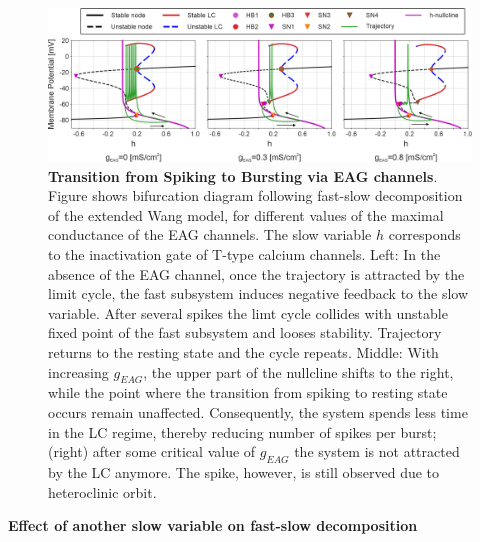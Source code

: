 \documentclass[../main.tex]{subfiles}
\begin{document}
\begin{figure}[!t]
    \centering
    \includegraphics[width=\linewidth]{../img/spiking_to_bursting/bifurcation_wang.png}
    \caption[Transition from Spiking to Bursting via EAG channels]{
        \textbf{Transition from Spiking to Bursting via EAG channels}. Figure shows bifurcation diagram following fast-slow decomposition of the extended Wang model, for different values of the maximal conductance of the EAG channels. The slow variable $h$ corresponds to the inactivation gate of T-type calcium channels.
        Left: In the absence of the EAG channel, once the trajectory is attracted by the limit cycle, the fast subsystem induces negative feedback to the slow variable. After several spikes the limt cycle collides with unstable fixed point of the fast subsystem and looses stability. Trajectory returns to the resting state and the cycle repeats. Middle: With increasing $g_{EAG}$, the upper part of the nullcline shifts to the right, while the point where the transition from spiking to resting state occurs remain unaffected. Consequently, the system spends less time in the LC regime, thereby reducing number of spikes per burst;
        (right) after some critical value of $g_{EAG}$ the system is not attracted by the LC anymore. The spike, however, is still observed due to heteroclinic orbit.
    }
    \label{fig:spiking_to_bursting_wang_bifurcation}
\end{figure}



\vspace*{0.3cm}
\noindent\textbf{Effect of another slow variable on fast-slow decomposition}
\end{document}
